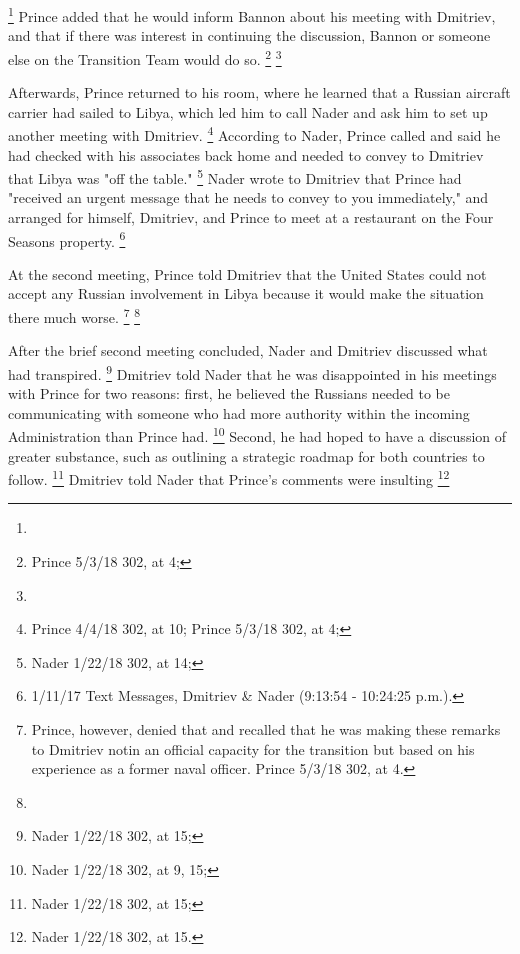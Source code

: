\footnote{}
Prince added that he would inform Bannon about his meeting with Dmitriev, and that if there was interest in continuing the discussion, Bannon or someone else on the Transition Team would do so.%
\footnote{Prince 5/3/18 302, at 4; }
\footnote{}

Afterwards, Prince returned to his room, where he learned that a Russian aircraft carrier had sailed to Libya, which led him to call Nader and ask him to set up another meeting with Dmitriev.%
\footnote{Prince 4/4/18 302, at 10;
Prince 5/3/18 302, at 4;
}
According to Nader, Prince called and said he had checked with his associates back home and needed to convey to Dmitriev that Libya was "off the table."%
\footnote{Nader 1/22/18 302, at 14;
}
Nader wrote to Dmitriev that Prince had "received an urgent message that he needs to convey to you immediately," and arranged for himself, Dmitriev, and Prince to meet at a restaurant on the Four Seasons property.%
\footnote{ 1/11/17 Text Messages, Dmitriev \& Nader (9:13:54 - 10:24:25 p.m.).}

At the second meeting, Prince told Dmitriev that the United States could not accept any Russian involvement in Libya because it would make the situation there much worse.%
\footnote{
Prince, however, denied that and recalled that he was making these remarks to Dmitriev notin an official capacity for the transition but based on his experience as a former naval officer. Prince 5/3/18 302, at 4.}
\footnote{}

After the brief second meeting concluded, Nader and Dmitriev discussed what had transpired.%
\footnote{Nader 1/22/18 302, at 15;
}
Dmitriev told Nader that he was disappointed in his meetings with Prince for two reasons: first, he believed the Russians needed to be communicating with someone who had more authority within the incoming Administration than Prince had.%
\footnote{Nader 1/22/18 302, at 9, 15;
}
Second, he had hoped to have a discussion of greater substance, such as outlining a strategic roadmap for both countries to follow.%
\footnote{Nader 1/22/18 302, at 15;
}
Dmitriev told Nader that
Prince's comments
were insulting
\footnote{ Nader 1/22/18 302, at 15.}

